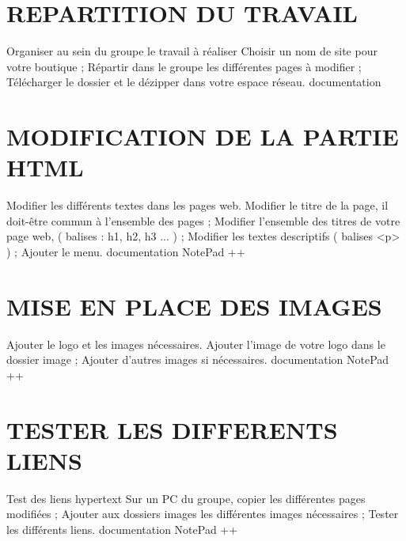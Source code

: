 \documentclass[11pt]{article}
\begin{document}
\UPSTIbuildPage



\section*{REPARTITION DU TRAVAIL}

\activiteressources
{Organiser au sein du groupe le travail à réaliser}
{
\task Choisir un nom de site pour votre boutique ;
\task Répartir dans le groupe les différentes pages à modifier ;
\task Télécharger le dossier et le dézipper dans votre espace réseau.
}
{documentation}
{}


\section*{MODIFICATION DE LA PARTIE HTML}

\activiteressources
{Modifier les différents textes dans les pages web.}
{
\task Modifier le titre de la page, il doit-être commun à l'ensemble des pages ;
\task Modifier l'ensemble des titres de votre page web, ( balises : h1, h2, h3 ... ) ;
\task Modifier les textes descriptifs ( balises <p> ) ;
\task Ajouter le menu.
}
{documentation}
{NotePad ++}

\section*{MISE EN PLACE DES IMAGES}

\activiteressources
{Ajouter le logo et les images nécessaires.}
{%
\task Ajouter l'image de votre logo dans le dossier image ;
\task Ajouter d'autres images si nécessaires.
}
{documentation}
{NotePad ++}

\section*{TESTER LES DIFFERENTS LIENS}

\activiteressources
{Test des liens hypertext}
{
\task Sur un PC du groupe, copier les différentes pages modifiées ;
\task Ajouter aux dossiers images les différentes images nécessaires ;
\task Tester les différents liens.
}
{documentation}
{NotePad ++}
\end{document}
